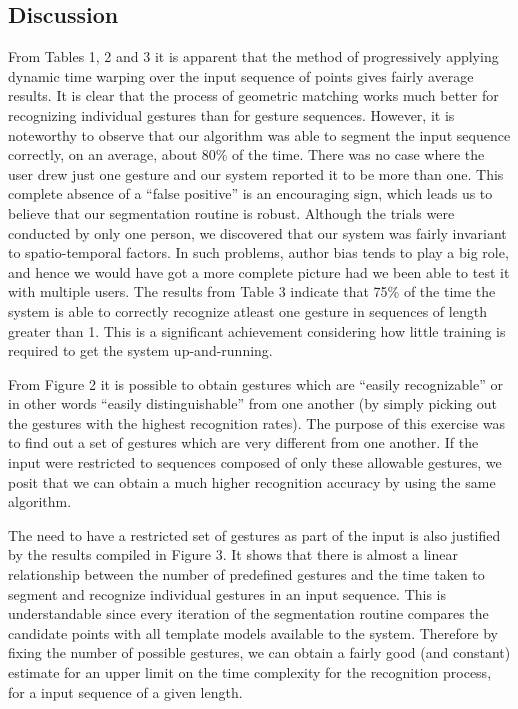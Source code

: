 \documentclass[twoside]{article}
\begin{document}
\begin{multicols}{2}
\section{Discussion}

From Tables 1, 2 and 3 it is apparent that the method of progressively applying dynamic time warping over the input sequence of points gives fairly average results. It is clear that the process of geometric matching works much better for recognizing individual gestures than for gesture sequences. However, it is noteworthy to observe that our algorithm was able to segment the input sequence correctly, on an average, about 80\% of the time. There was no case where the user drew just one gesture and our system reported it to be more than one. This complete absence of a ``false positive'' is an encouraging sign, which leads us to believe that our segmentation routine is robust. Although the trials were conducted by only one person, we discovered that our system was fairly invariant to spatio-temporal factors. In such problems, author bias tends to play a big role, and hence we would have got a more complete picture had we been able to test it with multiple users. The results from Table 3 indicate that 75\% of the time the system is able to correctly recognize atleast one gesture in sequences of length greater than 1. This is a significant achievement considering how little training is required to get the system up-and-running.

From Figure 2 it is possible to obtain gestures which are ``easily recognizable'' or in other words ``easily distinguishable'' from one another (by simply picking out the gestures with the highest recognition rates). 
The purpose of this exercise was to find out a set of gestures which are very different from one another. If the input were restricted to sequences composed of only these allowable gestures, we posit that we can obtain a much higher recognition accuracy by using the same algorithm.

The need to have a restricted set of gestures as part of the input is also justified by the results compiled in Figure 3. It shows that there is almost a linear relationship between the number of predefined gestures and the time taken to segment and recognize individual gestures in an input sequence. This is understandable since every iteration of the segmentation routine compares the candidate points with all template models available to the system. Therefore by fixing the number of possible gestures, we can obtain a fairly good (and constant) estimate for an upper limit on the time complexity for the recognition process, for a input sequence of a given length.


\end{multicols}
\end{document}
